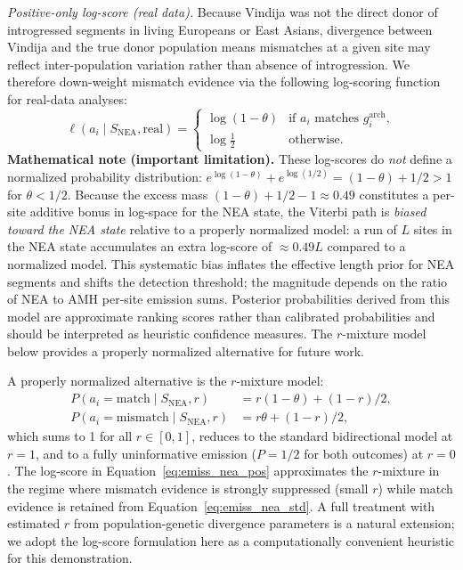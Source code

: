 \emph{Positive-only log-score (real data).}
Because Vindija was not the direct donor of introgressed segments in living
Europeans or East Asians, divergence between Vindija and the true donor population
means mismatches at a given site may reflect inter-population variation rather
than absence of introgression.
We therefore down-weight mismatch evidence via the following log-scoring function
for real-data analyses:
\begin{equation}
  \ell(a_i \mid S_\mathrm{NEA}, \text{real}) =
  \begin{cases}
    \log(1 - \theta) & \text{if } a_i \text{ matches } g_i^\mathrm{arch}, \\
    \log\!\tfrac{1}{2}        & \text{otherwise.}
  \end{cases}
  \label{eq:emiss_nea_pos}
\end{equation}
\textbf{Mathematical note (important limitation).}
These log-scores do \emph{not} define a normalized probability distribution:
$e^{\log(1-\theta)} + e^{\log(1/2)} = (1-\theta) + 1/2 > 1$ for $\theta < 1/2$.
Because the excess mass $(1-\theta) + 1/2 - 1 \approx 0.49$ constitutes a
per-site additive bonus in log-space for the NEA state, the Viterbi path is
\emph{biased toward the NEA state} relative to a properly normalized model:
a run of $L$ sites in the NEA state accumulates an extra log-score of
$\approx 0.49 L$ compared to a normalized model.
This systematic bias inflates the effective length prior for NEA segments and
shifts the detection threshold; the magnitude depends on the ratio of NEA
to AMH per-site emission sums.
Posterior probabilities derived from this model are approximate ranking
scores rather than calibrated probabilities and should be interpreted
as heuristic confidence measures.
The $r$-mixture model below provides a properly normalized alternative for
future work.

A properly normalized alternative is the $r$-mixture model:
\begin{align}
  P(a_i = \text{match} \mid S_\mathrm{NEA}, r) &= r(1-\theta) + (1-r)/2, \nonumber \\
  P(a_i = \text{mismatch} \mid S_\mathrm{NEA}, r) &= r\theta + (1-r)/2,
  \label{eq:r_mixture}
\end{align}
which sums to 1 for all $r \in [0,1]$, reduces to the standard bidirectional
model at $r=1$, and to a fully uninformative emission ($P=1/2$ for both outcomes)
at $r=0$.
The log-score in Equation~\eqref{eq:emiss_nea_pos} approximates the $r$-mixture in
the regime where mismatch evidence is strongly suppressed (small $r$) while match
evidence is retained from Equation~\eqref{eq:emiss_nea_std}.
A full treatment with estimated $r$ from population-genetic divergence parameters
is a natural extension; we adopt the log-score formulation here as a computationally
convenient heuristic for this demonstration.

